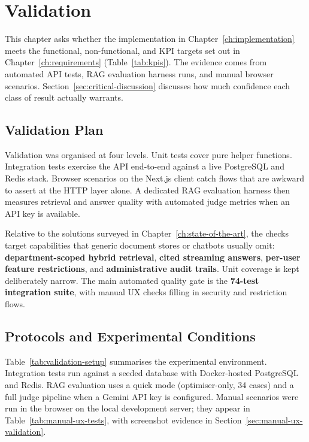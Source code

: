 \chapter{Validation}
\label{ch:validation}

This chapter asks whether the implementation in
Chapter~\ref{ch:implementation} meets the functional, non-functional, and KPI
targets set out in Chapter~\ref{ch:requirements} (Table~\ref{tab:kpis}). The
evidence comes from automated API tests, RAG evaluation harness runs, and
manual browser scenarios. Section~\ref{sec:critical-discussion} discusses how
much confidence each class of result actually warrants.

\section{Validation Plan}

Validation was organised at four levels. Unit tests cover pure helper functions.
Integration tests exercise the API end-to-end against a live PostgreSQL and Redis
stack. Browser scenarios on the Next.js client catch flows that are awkward to
assert at the HTTP layer alone. A dedicated RAG evaluation harness then measures
retrieval and answer quality with automated judge metrics when an API key is
available.

Relative to the solutions surveyed in Chapter~\ref{ch:state-of-the-art}, the
checks target capabilities that generic document stores or chatbots usually omit:
\textbf{department-scoped hybrid retrieval}, \textbf{cited streaming answers},
\textbf{per-user feature restrictions}, and \textbf{administrative audit trails}.
Unit coverage is kept deliberately narrow. The main automated quality gate is the
\textbf{74-test integration suite}, with manual UX checks filling in security and
restriction flows.

\section{Protocols and Experimental Conditions}

Table~\ref{tab:validation-setup} summarises the experimental environment.
Integration tests run against a seeded database with Docker-hosted PostgreSQL and
Redis. RAG evaluation uses a quick mode (optimiser-only, 34 cases) and a full
judge pipeline when a Gemini API key is configured. Manual scenarios were run in
the browser on the local development server; they appear in
Table~\ref{tab:manual-ux-tests}, with screenshot evidence in
Section~\ref{sec:manual-ux-validation}.

